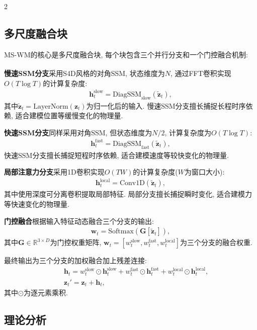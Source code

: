 \begin{multicols}{2}
\subsection{多尺度融合块}

MS-WM的核心是多尺度融合块, 每个块包含三个并行分支和一个门控融合机制:

\textbf{慢速SSM分支}采用S4D\textsuperscript{\cite{7}}风格的对角SSM, 状态维度为$N$, 通过FFT卷积实现$O(T\log T)$的计算复杂度:
\begin{eqnarray}
{\bm h}_t^{\text{slow}} = \text{DiagSSM}_{\text{slow}}(\tilde{{\bm z}}_t),
\end{eqnarray}
其中$\tilde{{\bm z}}_t = \text{LayerNorm}({\bm z}_t)$为归一化后的输入.
慢速SSM分支擅长捕捉长程时序依赖, 适合建模位置等缓慢变化的物理量.

\textbf{快速SSM分支}同样采用对角SSM, 但状态维度为$N/2$, 计算复杂度为$O(T\log T)$:
\begin{eqnarray}
{\bm h}_t^{\text{fast}} = \text{DiagSSM}_{\text{fast}}(\tilde{{\bm z}}_t),
\end{eqnarray}
快速SSM分支擅长捕捉短程时序依赖, 适合建模速度等较快变化的物理量.

\textbf{局部注意力分支}采用1D卷积实现$O(TW)$的计算复杂度($W$为窗口大小):
\begin{eqnarray}
{\bm h}_t^{\text{local}} = \text{Conv1D}(\tilde{{\bm z}}_t),
\end{eqnarray}
其中使用深度可分离卷积提取局部特征.
局部分支擅长捕捉瞬时变化, 适合建模力等快速变化的物理量.

\textbf{门控融合}根据输入特征动态融合三个分支的输出:
\begin{eqnarray}
{\bm w}_t = \text{Softmax}({\bm G}[\tilde{{\bm z}}_t]),
\end{eqnarray}
其中${\bm G} \in \mathbb{R}^{3 \times D}$为门控权重矩阵,
${\bm w}_t = [w_t^{\text{slow}}, w_t^{\text{fast}}, w_t^{\text{local}}]$为三个分支的融合权重.

最终输出为三个分支的加权融合加上残差连接:
\begin{eqnarray}
&&{\bm h}_t = w_t^{\text{slow}} \odot {\bm h}_t^{\text{slow}} + w_t^{\text{fast}} \odot {\bm h}_t^{\text{fast}} + w_t^{\text{local}} \odot {\bm h}_t^{\text{local}}, \\
&&{\bm z}_t' = {\bm z}_t + {\bm h}_t,
\end{eqnarray}
其中$\odot$为逐元素乘积.

\subsection{理论分析}


\end{multicols}
